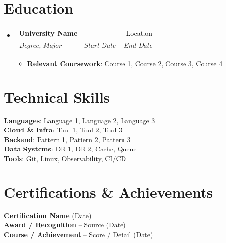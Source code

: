 \documentclass[a4paper,11pt]{article}
\makeatletter
\newcommand{\resumeItem}[1]{
  \item\small{
    {#1 \vspace{-2pt}}
  }
}
\newcommand{\resumeSubheading}[4]{
  \vspace{-2pt}\item
    \begin{tabular*}{0.97\textwidth}[t]{l@{\extracolsep{\fill}}r}
      \textbf{#1} & #2 \\
      \textit{\small#3} & \textit{\small #4} \\
    \end{tabular*}\vspace{-7pt}
}
\newcommand{\resumeSubHeadingListStart}{\begin{itemize}[leftmargin=0.15in, label={}]}
\newcommand{\resumeSubHeadingListEnd}{\end{itemize}}
\newcommand{\resumeItemListStart}{\begin{itemize}}
\newcommand{\resumeItemListEnd}{\end{itemize}\vspace{-5pt}}
\makeatother
\begin{document}
\section{Education}
  \resumeSubHeadingListStart
    \resumeSubheading
      {University Name}{Location}
      {Degree, Major}{Start Date -- End Date}
      \resumeItemListStart
        \resumeItem{\textbf{Relevant Coursework}: Course 1, Course 2, Course 3, Course 4}
      \resumeItemListEnd
  \resumeSubHeadingListEnd


\section{Technical Skills}
 \begin{itemize}[leftmargin=0.15in, label={}]
    \small{\item{
     \textbf{Languages}{: Language 1, Language 2, Language 3} \\
     \textbf{Cloud \& Infra}{: Tool 1, Tool 2, Tool 3} \\
     \textbf{Backend}{: Pattern 1, Pattern 2, Pattern 3} \\
     \textbf{Data Systems}{: DB 1, DB 2, Cache, Queue} \\
     \textbf{Tools}{: Git, Linux, Observability, CI/CD}
    }}
 \end{itemize}


\section{Certifications \& Achievements}
 \begin{itemize}[leftmargin=0.15in, label={}]
    \small{\item{
     \textbf{Certification Name} (Date) \\
     \textbf{Award / Recognition} -- Source (Date) \\
     \textbf{Course / Achievement} -- Score / Detail (Date)
    }}
 \end{itemize}

\end{document}
